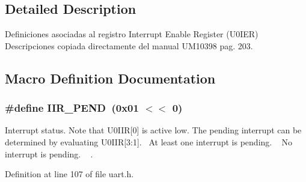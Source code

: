 \subsection{Detailed Description}
Definiciones asociadas al registro Interrupt Enable Register (U0\+I\+ER)~\newline
 Descripciones copiada directamente del manual U\+M10398 pag. 203. 



\subsection{Macro Definition Documentation}
\subsubsection[{\texorpdfstring{I\+I\+R\+\_\+\+P\+E\+ND}{IIR_PEND}}]{\setlength{\rightskip}{0pt plus 5cm}\#define I\+I\+R\+\_\+\+P\+E\+ND~(0x01 $<$$<$ 0)}\hypertarget{group___r_e_g_i_s_t_r_o___i_i_r_gaceec69c2af58ca0d5bc80828b2a58964}{}\label{group___r_e_g_i_s_t_r_o___i_i_r_gaceec69c2af58ca0d5bc80828b2a58964}


Interrupt status. Note that U0\+I\+IR\mbox{[}0\mbox{]} is active low. The pending interrupt can be determined by evaluating U0\+I\+IR\mbox{[}3\+:1\mbox{]}.~ At least one interrupt is pending. ~ No interrupt is pending. ~\newline
. 



Definition at line 107 of file uart.\+h.

